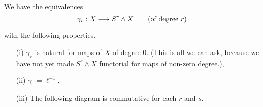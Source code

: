 \documentclass[../main]{subfiles}
\begin{document}
\begin{proposition}
\label{prop:p3c04.9}
We have the equivalences \[\gamma_r : X \lar{} \underline S^r \wedge X \qquad \text {(of degree } r\text{)}\] with the following properties. 

\begin{enumerate}
    \item[(i)] $\gamma_r$ is natural for maps of $X$ of degree $0$. (This is all we can ask, because we have not yet made $\underline S^r \wedge X$ functorial for maps of non-zero degree.),
    \item[(ii)] $\gamma_0 = \ell^{-1}$,
    \item[(iii)] The following diagram is commutative for each $r$ and $s$.
    \begin{center}
    \end{center}
\end{enumerate}
\end{proposition}
\end{document}
